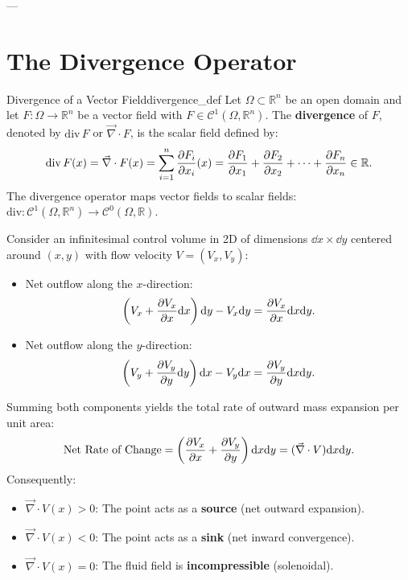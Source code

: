 ---

\section{The Divergence Operator}

\begin{definition}{Divergence of a Vector Field}{divergence_def}
Let $\Omega \subset \mathbb{R}^n$ be an open domain and let $F : \Omega \to \mathbb{R}^n$ be a vector field with $F \in \mathcal{C}^1(\Omega, \mathbb{R}^n)$. The \textbf{divergence} of $F$, denoted by $\mathrm{div}\,F$ or $\vec{\nabla} \cdot F$, is the scalar field defined by:
\begin{equation}
    \mathrm{div}\,F(x) = \vec{\nabla} \cdot F(x) = \sum_{i=1}^n \pdv{F_i}{x_i}(x) = \pdv{F_1}{x_1} + \pdv{F_2}{x_2} + \dots + \pdv{F_n}{x_n} \in \mathbb{R}.
\end{equation}
The divergence operator maps vector fields to scalar fields: $\mathrm{div} : \mathcal{C}^1(\Omega, \mathbb{R}^n) \to \mathcal{C}^0(\Omega, \mathbb{R})$.
\end{definition}

\begin{remarque}
Consider an infinitesimal control volume in 2D of dimensions $\dd x \times \dd y$ centered around $(x, y)$ with flow velocity $V = (V_x, V_y)$:
\begin{itemize}
    \item Net outflow along the $x$-direction:
    \begin{equation}
        \left( V_x + \pdv{V_x}{x} \dd x \right) \dd y - V_x \dd y = \pdv{V_x}{x} \dd x \dd y.
    \end{equation}
    \item Net outflow along the $y$-direction:
    \begin{equation}
        \left( V_y + \pdv{V_y}{y} \dd y \right) \dd x - V_y \dd x = \pdv{V_y}{y} \dd x \dd y.
    \end{equation}
\end{itemize}
Summing both components yields the total rate of outward mass expansion per unit area:
\begin{equation}
    \text{Net Rate of Change} = \left( \pdv{V_x}{x} + \pdv{V_y}{y} \right) \dd x \dd y = (\vec{\nabla} \cdot V) \dd x \dd y.
\end{equation}
Consequently:
\begin{itemize}
    \item $\vec{\nabla} \cdot V(x) > 0$: The point acts as a \textbf{source} (net outward expansion).
    \item $\vec{\nabla} \cdot V(x) < 0$: The point acts as a \textbf{sink} (net inward convergence).
    \item $\vec{\nabla} \cdot V(x) = 0$: The fluid field is \textbf{incompressible} (solenoidal).
\end{itemize}
\end{remarque}

